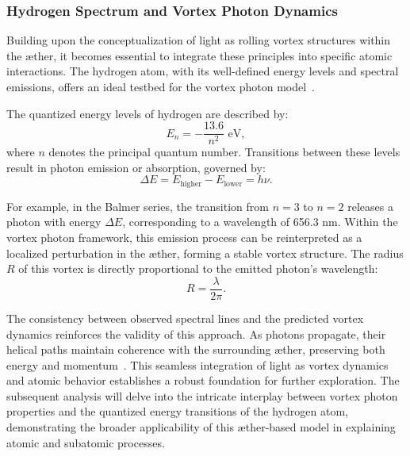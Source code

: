 \documentclass[a4paper,10pt]{article}
\begin{document}
\subsubsection*{Hydrogen Spectrum and Vortex Photon Dynamics}
Building upon the conceptualization of light as rolling vortex structures within the æther, it becomes essential to integrate these principles into specific atomic interactions.
The hydrogen atom, with its well-defined energy levels and spectral emissions, offers an ideal testbed for the vortex photon model~\cite{maxwell1861, clausius1865}.

The quantized energy levels of hydrogen are described by:
\begin{equation*}
    E_n = -\frac{13.6}{n^2} \text{ eV},\label{eq:quantized energy levels}
\end{equation*}
where $n$ denotes the principal quantum number.
Transitions between these levels result in photon emission or absorption, governed by:
\begin{equation*}
    \Delta E = E_\text{higher} - E_\text{lower} = h \nu.\label{eq:emission or absorption}
\end{equation*}

For example, in the Balmer series, the transition from $n=3$ to $n=2$ releases a photon with energy $\Delta E$, corresponding to a wavelength of 656.3 nm.
Within the vortex photon framework, this emission process can be reinterpreted as a localized perturbation in the æther, forming a stable vortex structure.
The radius $R$ of this vortex is directly proportional to the emitted photon's wavelength:
\begin{equation*}
    R = \frac{\lambda}{2\pi}.\label{eq:photon wavelength}
\end{equation*}

The consistency between observed spectral lines and the predicted vortex dynamics reinforces the validity of this approach.
As photons propagate, their helical paths maintain coherence with the surrounding æther, preserving both energy and momentum~\cite{verlinde2010, raymer2007}.
This seamless integration of light as vortex dynamics and atomic behavior establishes a robust foundation for further exploration.
The subsequent analysis will delve into the intricate interplay between vortex photon properties and the quantized energy transitions of the hydrogen atom, demonstrating the broader applicability of this æther-based model in explaining atomic and subatomic processes.
\end{document}
